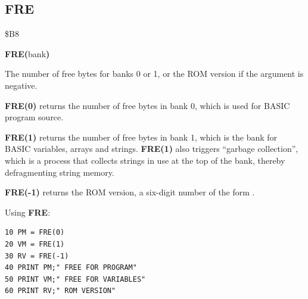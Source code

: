 
\newpage
\subsection{FRE}
\begin{description}[leftmargin=2cm,style=nextline]
\item [Token:] \$B8
\item [Format:] {\bf FRE(}bank{\bf)}
\item [Returns:] The number of free bytes for banks 0 or 1,
               or the ROM version if the argument is negative.

               {\bf FRE(0)} returns the number of free bytes in
               bank 0, which is used for BASIC program source.

               {\bf FRE(1)} returns the number of free bytes in
               bank 1, which is the bank for BASIC variables, arrays
               and strings. {\bf FRE(1)} also triggers
               ``garbage collection'', which is a process that collects
               strings in use at the top of the bank, thereby
               defragmenting string memory.

               {\bf FRE(-1)} returns the ROM version, a six-digit number
               of the form .

\item [Example:] Using {\bf FRE}:
\begin{tcolorbox}[colback=black,coltext=white]
\verbatimfont{\codefont}
\begin{verbatim}
10 PM = FRE(0)
20 VM = FRE(1)
30 RV = FRE(-1)
40 PRINT PM;" FREE FOR PROGRAM"
50 PRINT VM;" FREE FOR VARIABLES"
60 PRINT RV;" ROM VERSION"
\end{verbatim}
\end{tcolorbox}
\end{description}


\newpage
